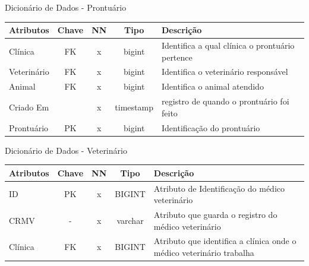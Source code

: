 \documentclass[
    12pt,               %
    openright,          %
    oneside,
    a4paper,            %
    BIBLATEX,           %
    TODO,               %
    english,            %
    brazil              %
    ]{ifsp-spo-inf-ctds}
\begin{document}
            \begin{center}
              \begin{quadro}[H]
              \centering
                  \caption{Dicionário de Dados - Prontuário}
                  \begin{tabulary}{1.0\textwidth}{|p{9em}|c|c|c|p{19em}|}
                \hline
                Atributos & Chave & NN & Tipo & Descrição\\
                \hline
                Clínica & FK & x & bigint & Identifica a qual clínica o prontuário pertence \\
                \hline
                Veterinário & FK & x & bigint & Identifica o veterinário responsável \\
                \hline
                Animal & FK & x & bigint & Identifica o animal atendido \\
                \hline
                Criado Em & & x & timestamp & registro de quando o prontuário foi feito \\
                \hline
                Prontuário & PK & x & bigint & Identificação do prontuário \\
                \hline
                \end{tabulary}
                 
                  \label{qd: md-prontuario}
              \end{quadro}
            \end{center}
    
            \begin{center}
              \begin{quadro}[H]
              \centering
                  \caption{Dicionário de Dados - Veterinário}
                  \begin{tabulary}{1.0\textwidth}{|p{9em}|c|c|c|p{19em}|}
                \hline
                Atributos & Chave & NN & Tipo & Descrição\\
                \hline
                ID & PK & x & BIGINT & Atributo de Identificação do médico veterinário \\
                \hline
                CRMV & - & x & varchar & Atributo que guarda o registro do médico veterinário\\
                \hline
                Clínica & FK & x & BIGINT & Atributo que identifica a clínica onde o médico veterinário trabalha\\
                \hline
                \end{tabulary}
                 
                  \label{qd: md-veterinario}
              \end{quadro}
            \end{center}
    
\end{document}
